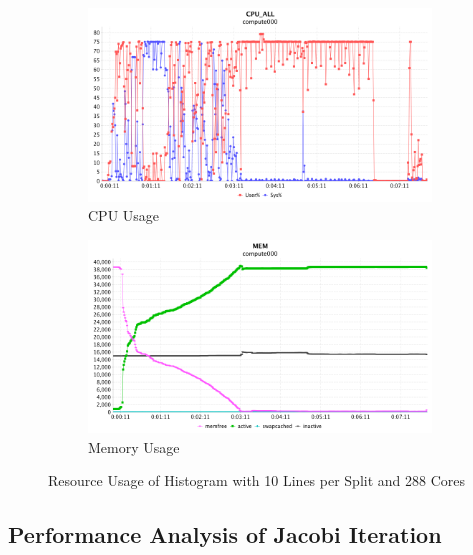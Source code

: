 \begin{figure}[!ht]
\begin{subfigure}{1\textwidth}
  \centering
  \includegraphics[width=1\linewidth]{figures/Hist10_288_CPU.png}
  \caption{CPU Usage}
  \label{Hist10_288_CPU}
\end{subfigure}
\begin{subfigure}{1\textwidth}
  \centering
  \includegraphics[width=1\linewidth]{figures/Hist10_288_MEM.png}
  \caption{Memory Usage}
  \label{Hist10_288_MEM}
\end{subfigure}
\caption{Resource Usage of Histogram with 10 Lines per Split and 288 Cores}
\label{Hist10_288}
\end{figure}

\subsection{Performance Analysis of Jacobi Iteration}

